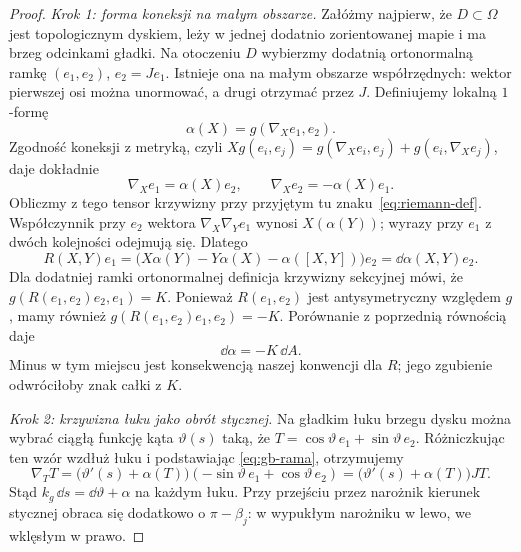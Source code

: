 \begin{proof}
\emph{Krok 1: forma koneksji na małym obszarze.}
Załóżmy najpierw, że $D\subset\Omega$ jest topologicznym
dyskiem, leży w jednej dodatnio zorientowanej mapie i ma
brzeg odcinkami gładki. Na otoczeniu $D$ wybierzmy
dodatnią ortonormalną ramkę $(e_1,e_2)$, $e_2=Je_1$.
Istnieje ona na małym obszarze współrzędnych: wektor
pierwszej osi można unormować, a drugi otrzymać przez $J$.
Definiujemy lokalną $1$-formę
\[
 \alpha(X)=g(\nabla_Xe_1,e_2).
\]
Zgodność koneksji z metryką, czyli
$Xg(e_i,e_j)=g(\nabla_Xe_i,e_j)+g(e_i,\nabla_Xe_j)$,
daje dokładnie
\begin{equation}\label{eq:gb-rama}
 \nabla_Xe_1=\alpha(X)e_2,
 \qquad \nabla_Xe_2=-\alpha(X)e_1.
\end{equation}
Obliczmy z tego tensor krzywizny przy przyjętym tu
znaku~\eqref{eq:riemann-def}. Współczynnik przy $e_2$
wektora $\nabla_X\nabla_Ye_1$ wynosi $X(\alpha(Y))$;
wyrazy przy $e_1$ z dwóch kolejności odejmują się.
Dlatego
\[
 R(X,Y)e_1
 =\bigl(X\alpha(Y)-Y\alpha(X)-\alpha([X,Y])\bigr)e_2
 =\dd\alpha(X,Y)e_2.
\]
Dla dodatniej ramki ortonormalnej definicja krzywizny
sekcyjnej mówi, że
$g(R(e_1,e_2)e_2,e_1)=K$. Ponieważ $R(e_1,e_2)$
jest antysymetryczny względem $g$, mamy również
$g(R(e_1,e_2)e_1,e_2)=-K$. Porównanie z poprzednią
równością daje
\begin{equation}\label{eq:gb-dalpha}
 \dd\alpha=-K\,\dd A.
\end{equation}
Minus w tym miejscu jest konsekwencją naszej konwencji
dla $R$; jego zgubienie odwróciłoby znak całki z $K$.

\emph{Krok 2: krzywizna łuku jako obrót stycznej.}
Na gładkim łuku brzegu dysku można wybrać ciągłą
funkcję kąta $\vartheta(s)$ taką, że
$T=\cos\vartheta\,e_1+\sin\vartheta\,e_2$.
Różniczkując ten wzór wzdłuż łuku i podstawiając
\eqref{eq:gb-rama}, otrzymujemy
\[
 \nabla_TT
 =\bigl(\vartheta'(s)+\alpha(T)\bigr)
             (-\sin\vartheta\,e_1+\cos\vartheta\,e_2)
 =\bigl(\vartheta'(s)+\alpha(T)\bigr)JT.
\]
Stąd $k_g\,\dd s=\dd\vartheta+\alpha$ na każdym łuku.
Przy przejściu przez narożnik kierunek stycznej
obraca się dodatkowo o $\pi-\beta_j$: w wypukłym
narożniku w lewo, we wklęsłym w prawo.


\end{proof}
